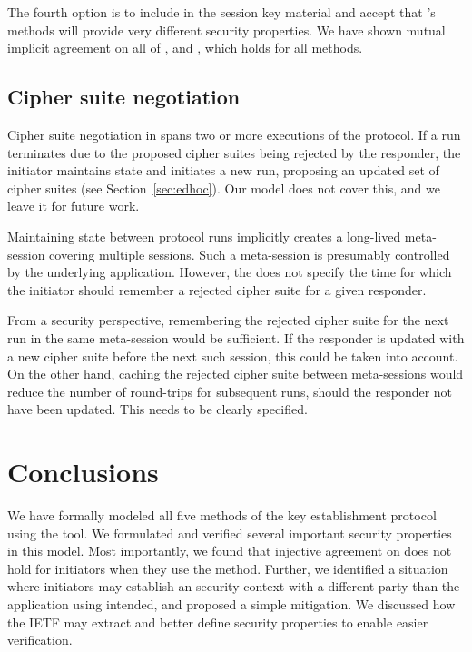 \documentclass[runningheads, envcountsame, a4paper, draft, x11names]{llncs}
\newcommand{\spacehack}{\vspace{-1em}}
\newcommand{\fillhack}{\vspace{-0.5em}}
\begin{document}
The fourth option is to include \mGiy{} in the session key material and accept
that \mEdhoc{}'s methods will provide very different security properties.
%
We have shown mutual implicit agreement on all of \mGixy{}, \mGiy{} and \mGrx{},
which holds for all methods.
%

\spacehack
\subsection{Cipher suite negotiation}
\label{sec:ciphersuiteNegotiation}
\fillhack
{}
%
Cipher suite negotiation in \mEdhoc{} spans two or more executions of the
protocol.
%
If a run terminates due to the proposed cipher suites being rejected by the
responder, the initiator maintains state and initiates a new run, proposing
an updated set of cipher suites (see Section~\ref{sec:edhoc}).
%
Our model does not cover this, and we leave it for future work.

Maintaining state between protocol runs implicitly creates a long-lived
meta-session covering multiple \mEdhoc{} sessions.
%
Such a meta-session is presumably controlled by the underlying application.
%
However, the \mSpec{} does not specify the time for which the initiator should
remember a rejected cipher suite for a given responder.
%

From a security perspective, remembering the rejected cipher suite for the
next \mEdhoc{} run in the same meta-session would be sufficient.
%
If the responder is updated with a new cipher suite before the next such
session, this could be taken into account. On the other hand, caching the
rejected cipher suite between meta-sessions would reduce the number of
round-trips for subsequent runs, should the responder not have been updated.
%
This needs to be clearly specified. 

\spacehack
\section{Conclusions}
\label{sec:conclusions}
\fillhack
We have formally modeled all five
methods of the \mEdhoc{} key establishment protocol using the \mTamarin{} tool.
%
We formulated and verified several important security properties in this model. 
%
%
Most importantly, we found that injective agreement on \mGiy{} does not hold for
initiators when they use the \mStat{} method.
%
Further, we identified a situation where initiators may establish an \mOscore{}
security context with a different party than the application using \mEdhoc{}
intended, and proposed a simple mitigation.
%
We discussed how the IETF may extract and better define security properties to
enable easier verification.
%
\end{document}
